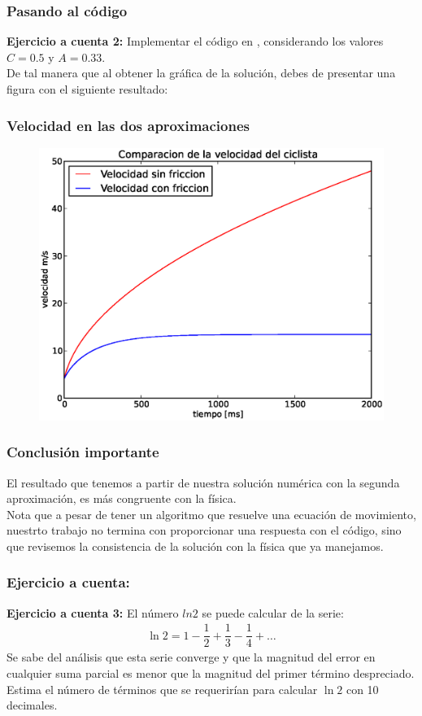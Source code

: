 \documentclass[12pt]{beamer}
\begin{document}
\begin{frame}
\frametitle{Pasando al código}
\textbf{Ejercicio a cuenta 2: } Implementar el código en \python, considerando los valores $C = 0.5$ y $A=0.33$.
\\
\bigskip
\pause
De tal manera que al obtener la gráfica de la solución, debes de presentar una figura con el siguiente resultado:
\end{frame}
\begin{frame}
\frametitle{Velocidad en las dos aproximaciones}
\begin{figure}[H]
	\centering
	\includegraphics[scale=0.475]{Imagenes/EjerBicicleta02.eps}
\end{figure}
\end{frame}
\begin{frame}
\frametitle{Conclusión importante}
El resultado que tenemos a partir de nuestra solución numérica con la segunda aproximación, \textcolor{ao}{es más congruente con la física}.
\\
\bigskip
\pause
Nota que a pesar de tener un algoritmo que resuelve una ecuación de movimiento, nuestrto trabajo no termina con proporcionar una respuesta con el código, \pause sino que revisemos la consistencia de la solución con la física que ya manejamos.
\end{frame}
\begin{frame}
\frametitle{Ejercicio a cuenta:}
\textbf{Ejercicio a cuenta 3: } El número $ln 2$ se puede calcular de la serie:
\begin{align*}
\ln 2 = 1 - \dfrac{1}{2} + \dfrac{1}{3} -\dfrac{1}{4} + \ldots
\end{align*}
Se sabe del análisis que esta serie converge y que la magnitud del error en cualquier suma parcial es menor que la magnitud del primer término despreciado. Estima el número de términos que se requerirían para calcular $\ln 2$ con 10 decimales.
\end{frame}
\end{document}
